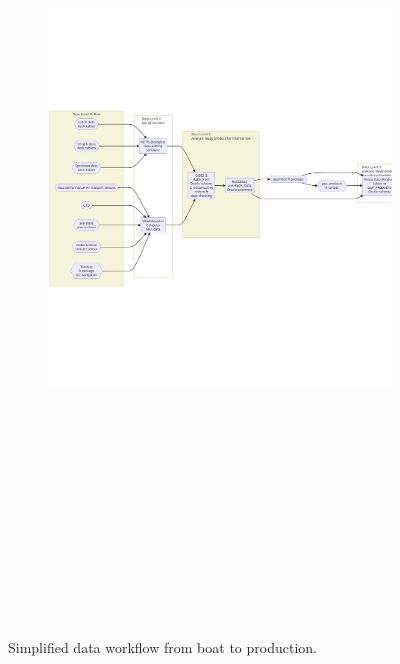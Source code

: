 \documentclass[
  letterpaper,
  oneside,
  open=any]{scrbook}
\begin{document}
\begin{figure}

{\centering 

\begin{figure}[H]

{\centering \includegraphics[width=17.45in,height=8.76in]{content/intro-workflow_files/figure-latex/mermaid-figure-3.png}

}

\end{figure}

}

\caption{\label{fig-workflow}Simplified data workflow from boat to
production.}

\end{figure}
\end{document}
